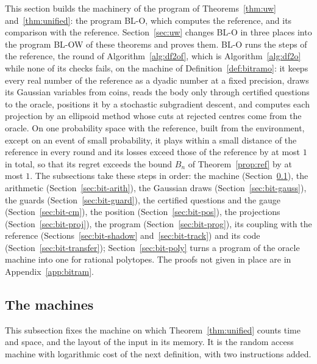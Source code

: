\documentclass[11pt]{amsart}
\theoremstyle{definition}
\numberwithin{equation}{section}
\begin{document}
This section builds the machinery of the program of Theorems~\ref{thm:uw} and~\ref{thm:unified}: the program BL-O, which computes the reference, and its comparison with the reference. Section~\ref{sec:uw} changes BL-O in three places into the program BL-OW of these theorems and proves them. BL-O runs the steps of the reference, the round of Algorithm~\ref{alg:df2of}, which is Algorithm~\ref{alg:df2o} while none of its checks fails, on the machine of Definition~\ref{def:bitramo}: it keeps every real number of the reference as a dyadic number at a fixed precision, draws its Gaussian variables from coins, reads the body only through certified questions to the oracle, positions it by a stochastic subgradient descent, and computes each projection by an ellipsoid method whose cuts at rejected centres come from the oracle. On one probability space with the reference, built from the environment, except on an event of small probability, it plays within a small distance of the reference in every round and its losses exceed those of the reference by at most $1$ in total, so that its regret exceeds the bound $B_n$ of Theorem~\ref{prop:ref} by at most $1$. The subsections take these steps in order: the machine (Section~\ref{sec:bit-machine}), the arithmetic (Section~\ref{sec:bit-arith}), the Gaussian draws (Section~\ref{sec:bit-gauss}), the guards (Section~\ref{sec:bit-guard}), the certified questions and the gauge (Section~\ref{sec:bit-cm}), the position (Section~\ref{sec:bit-pos}), the projections (Section~\ref{sec:bit-proj}), the program (Section~\ref{sec:bit-prog}), its coupling with the reference (Sections~\ref{sec:bit-shadow} and~\ref{sec:bit-track}) and its code (Section~\ref{sec:bit-transfer}); Section~\ref{sec:bit-poly} turns a program of the oracle machine into one for rational polytopes. The proofs not given in place are in Appendix~\ref{app:bitram}.

\subsection{The machines}\label{sec:bit-machine}

This subsection fixes the machine on which Theorem~\ref{thm:unified} counts time and space, and the layout of the input in its memory. It is the random access machine with logarithmic cost of the next definition, with two instructions added.
\end{document}
